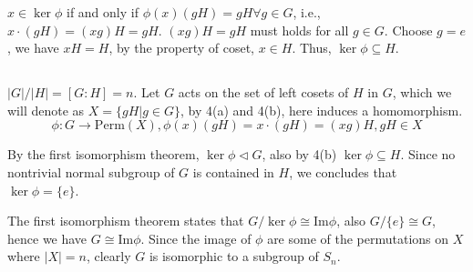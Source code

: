 \documentclass[12pt]{article}
\begin{document}
$x\in\ker{\phi}$ if and only if $\phi(x)(gH)=gH\forall g\in G$, i.e., $x\cdot(gH)=(xg)H=gH$. $(xg)H=gH$ must holds for all $g\in G$. Choose $g=e$, we have $xH=H$, by the property of coset, $x\in H$. Thus, $\ker{\phi}\subseteq H$.

\subsection{}
$|G|/|H|=[G:H]=n$. Let $G$ acts on the set of left cosets of $H$ in $G$, which we will denote as $X=\{gH|g\in G\}$, by 4(a) and 4(b), here induces a homomorphism.
$$\phi:G\rightarrow\mathrm{Perm}(X),\phi(x)(gH)=x\cdot(gH)=(xg)H,gH\in X$$

By the first isomorphism theorem, $\ker{\phi}\triangleleft G$, also by 4(b) $\ker{\phi}\subseteq H$. Since no nontrivial normal subgroup of $G$ is contained in $H$, we concludes that $\ker\phi=\{e\}$.

The first isomorphism theorem states that $G/\ker{\phi}\cong\mathrm{Im}{\phi}$, also $G/\{e\}\cong G$, hence we have $G\cong\mathrm{Im}{\phi}$. Since the image of $\phi$ are some of the permutations on $X$ where $|X|=n$, clearly $G$ is isomorphic to a subgroup of $S_n$.
\end{document}
